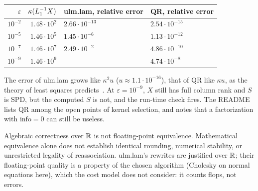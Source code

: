 \begin{center}\small
\begin{tabularx}{\linewidth}{@{}rrLP{2.6cm}@{}}
\toprule
\(\varepsilon\) & \(\kappa(L_1^{-1} X)\) & \textbf{ulm.lam, relative error} & \textbf{QR, relative error} \\
\midrule
\(10^{-2}\) & \(1.48\cdot 10^{2}\) & \(2.66\cdot 10^{-13}\) & \(2.54\cdot 10^{-15}\) \\
\(10^{-5}\) & \(1.46\cdot 10^{5}\) & \(1.45\cdot 10^{-6}\) & \(1.13\cdot 10^{-12}\) \\
\(10^{-7}\) & \(1.46\cdot 10^{7}\) & \(2.49\cdot 10^{-2}\) & \(4.86\cdot 10^{-10}\) \\
\(10^{-9}\) & \(1.46\cdot 10^{9}\) &  & \(4.74\cdot 10^{-8}\) \\
\bottomrule
\end{tabularx}
\end{center}

The error of ulm.lam grows like \(\kappa^2 u\) (\(u \approx 1.1\cdot
10^{-16}\)), that of QR like \(\kappa u\), as the theory of least squares
predicts~\cite{higham}. At \(\varepsilon = 10^{-9}\), \(X\) still has full
column rank and \(S\) is SPD, but the computed \(S\) is not, and the
run-time check fires. The README lists QR among the open points of kernel
selection, and notes that a factorization with \(\mathrm{info} = 0\) can
still be useless.

\begin{limit}
Algebraic correctness over \(\mathbb{R}\) is not floating-point equivalence.
Mathematical equivalence alone does not establish identical rounding,
numerical stability, or unrestricted legality of reassociation. ulm.lam's
rewrites are justified over \(\mathbb{R}\); their floating-point quality is a
property of the chosen algorithm (Cholesky on normal equations here), which
the cost model does not consider: it counts flops, not errors.
\end{limit}
